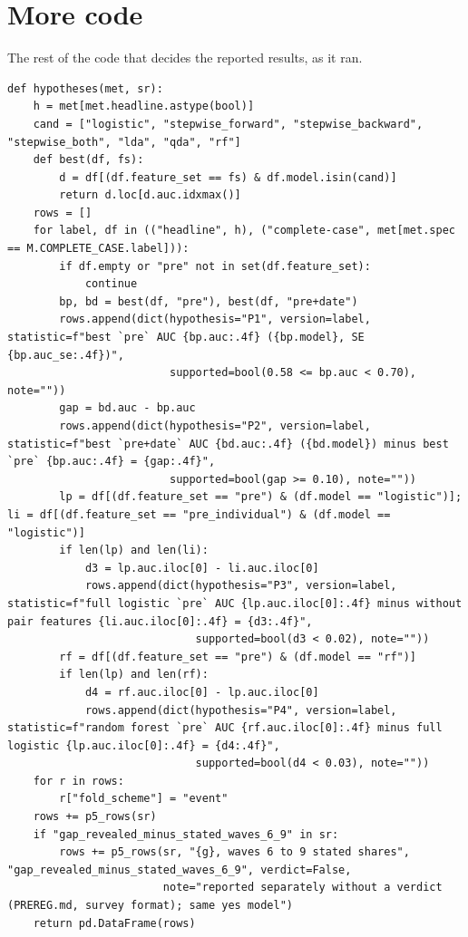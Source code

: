 \documentclass[11pt]{article}
\begin{document}
\section{More code}

The rest of the code that decides the reported results, as it ran.

\begin{lstlisting}[caption={How P1 to P4 are decided (scripts/part1\_models.py)}]
def hypotheses(met, sr):
    h = met[met.headline.astype(bool)]
    cand = ["logistic", "stepwise_forward", "stepwise_backward", "stepwise_both", "lda", "qda", "rf"]
    def best(df, fs):
        d = df[(df.feature_set == fs) & df.model.isin(cand)]
        return d.loc[d.auc.idxmax()]
    rows = []
    for label, df in (("headline", h), ("complete-case", met[met.spec == M.COMPLETE_CASE.label])):
        if df.empty or "pre" not in set(df.feature_set):
            continue
        bp, bd = best(df, "pre"), best(df, "pre+date")
        rows.append(dict(hypothesis="P1", version=label, statistic=f"best `pre` AUC {bp.auc:.4f} ({bp.model}, SE {bp.auc_se:.4f})",
                         supported=bool(0.58 <= bp.auc < 0.70), note=""))
        gap = bd.auc - bp.auc
        rows.append(dict(hypothesis="P2", version=label, statistic=f"best `pre+date` AUC {bd.auc:.4f} ({bd.model}) minus best `pre` {bp.auc:.4f} = {gap:.4f}",
                         supported=bool(gap >= 0.10), note=""))
        lp = df[(df.feature_set == "pre") & (df.model == "logistic")]; li = df[(df.feature_set == "pre_individual") & (df.model == "logistic")]
        if len(lp) and len(li):
            d3 = lp.auc.iloc[0] - li.auc.iloc[0]
            rows.append(dict(hypothesis="P3", version=label, statistic=f"full logistic `pre` AUC {lp.auc.iloc[0]:.4f} minus without pair features {li.auc.iloc[0]:.4f} = {d3:.4f}",
                             supported=bool(d3 < 0.02), note=""))
        rf = df[(df.feature_set == "pre") & (df.model == "rf")]
        if len(lp) and len(rf):
            d4 = rf.auc.iloc[0] - lp.auc.iloc[0]
            rows.append(dict(hypothesis="P4", version=label, statistic=f"random forest `pre` AUC {rf.auc.iloc[0]:.4f} minus full logistic {lp.auc.iloc[0]:.4f} = {d4:.4f}",
                             supported=bool(d4 < 0.03), note=""))
    for r in rows:
        r["fold_scheme"] = "event"
    rows += p5_rows(sr)
    if "gap_revealed_minus_stated_waves_6_9" in sr:
        rows += p5_rows(sr, "{g}, waves 6 to 9 stated shares", "gap_revealed_minus_stated_waves_6_9", verdict=False,
                        note="reported separately without a verdict (PREREG.md, survey format); same yes model")
    return pd.DataFrame(rows)
\end{lstlisting}
\end{document}
